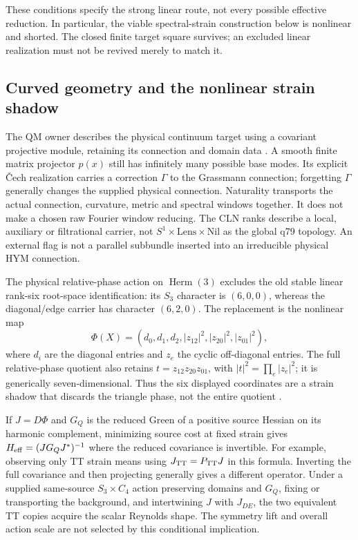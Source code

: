 \documentclass[11pt]{article}
\begin{document}
These conditions specify the strong linear route, not every possible
effective reduction. In particular, the viable spectral-strain construction
below is nonlinear and shorted. The closed finite target square survives;
an excluded linear realization must not be revived merely to match it.

\subsection{Curved geometry and the nonlinear strain shadow}
\label{sec:consumer-geometry}
The QM owner describes the physical continuum target using a covariant
projective module, retaining its connection and domain data
\cite{QMGeometry,FrozenProjective,FrozenCech}. A smooth finite matrix
projector $p(x)$ still has infinitely many possible base modes. Its explicit
\v{C}ech realization carries a correction $\Gamma$ to the Grassmann connection;
forgetting $\Gamma$ generally changes the supplied physical connection.
Naturality transports the actual connection, curvature, metric and spectral
windows together. It does not make a chosen raw Fourier window reducing.
The CLN ranks describe a local, auxiliary or filtrational carrier, not
$S^1\times\mathrm{Lens}\times\mathrm{Nil}$ as the global q79 topology.
An external flag is not a parallel subbundle inserted into an irreducible
physical HYM connection.

\label{sec:consumer-strain}
The physical relative-phase action on $\operatorname{Herm}(3)$ excludes the
old stable linear rank-six root-space identification: its $S_3$ character is
$(6,0,0)$, whereas the diagonal/edge carrier has character $(6,2,0)$.
The replacement is the nonlinear map
\[
 \Phi(X)=(d_0,d_1,d_2,|z_{12}|^2,|z_{20}|^2,|z_{01}|^2),
\]
where $d_i$ are the diagonal entries and $z_e$ the cyclic off-diagonal entries.
The full relative-phase quotient also retains
$t=z_{12}z_{20}z_{01}$, with $|t|^2=\prod_e|z_e|^2$; it is generically
seven-dimensional. Thus the six displayed coordinates are a strain shadow
that discards the triangle phase, not the entire quotient
\cite{FrozenStrain}.

If $J=D\Phi$ and $G_Q$ is the reduced Green of a positive source Hessian
on its harmonic complement, minimizing source cost at fixed strain gives
$H_{\rm eff}=(JG_QJ^*)^{-1}$ where the reduced covariance is invertible.
For example, observing
only TT strain means using $J_{\rm TT}=P_{\rm TT}J$ in this formula.
Inverting the full covariance and then projecting generally gives a different
operator. Under a supplied same-source $S_3\times C_4$ action preserving
domains and $G_Q$, fixing or transporting the background, and intertwining
$J$ with $J_{DE}$, the two equivalent TT copies acquire the scalar Reynolds
shape. The symmetry lift and overall action scale are not selected by this
conditional implication.
\end{document}
